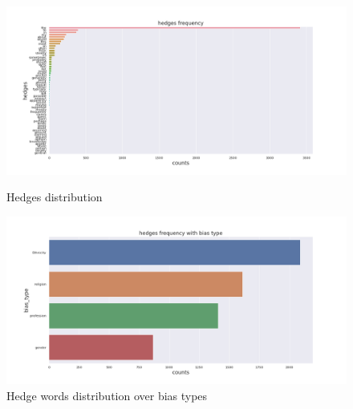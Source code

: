 \begin{figure}[h!]
\centering
\begin{minipage}{.5\textwidth}
  \centering
      \includegraphics[width=1\textwidth]{thesis/figures/lexicons/Lexiconshedges frequency.png}
    \caption{ Hedges distribution}
  \label{fig:test1}
\end{minipage}%
\begin{minipage}{.5\textwidth}
  \centering
    \includegraphics[width=1\textwidth]{thesis/figures/lexicons/Lexiconshedges frequency with bias type.png}
    \caption{Hedge words distribution over bias types}
  \label{fig:test2}
\end{minipage}
\end{figure}

